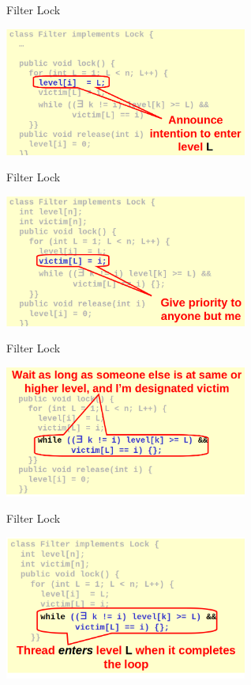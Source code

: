 \begin{frame}{Filter Lock}
\begin{center}
  \includegraphics[width=0.6\textwidth]{./pics/filter/f3.png}
\end{center}
\end{frame}

\begin{frame}{Filter Lock}
\begin{center}
  \includegraphics[width=0.6\textwidth]{./pics/filter/f4.png}
\end{center}
\end{frame}

\begin{frame}{Filter Lock}
\begin{center}
  \includegraphics[width=0.6\textwidth]{./pics/filter/f5.png}
\end{center}
\end{frame}

\begin{frame}{Filter Lock}
\begin{center}
  \includegraphics[width=0.6\textwidth]{./pics/filter/f6.png}
\end{center}
\end{frame}


